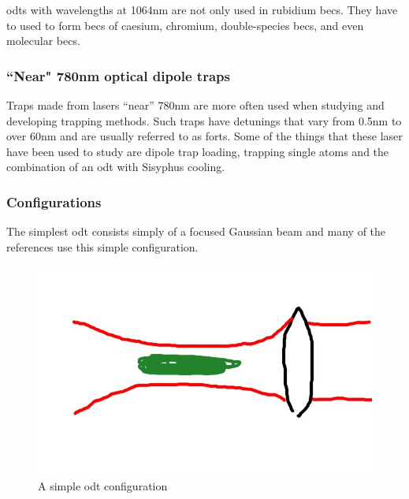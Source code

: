 \glspl{odt} with wavelengths at 1064nm are not only used in rubidium \glspl{bec}. They have to used to form \glspl{bec} of caesium\cite{hung_accelerating_2008}, chromium\cite{beaufils_all-optical_2008}, double-species \glspl{bec}\cite{thalhammer_double_2008}, and even molecular \glspl{bec}\cite{zwierlein_observation_2003}.

\subsubsection{``Near" 780nm optical dipole traps}
Traps made from lasers ``near'' 780nm are more often used when studying and developing trapping methods. Such traps have detunings that vary from 0.5nm\cite{miller_rf-induced_2002} to over 60nm\cite{miller_far-off-resonance_1993, weber_analysis_2006} and are usually referred to as \glspl{fort}. Some of the things that these laser have been used to study are dipole trap loading\cite{kuppens_loading_2000}, trapping single atoms\cite{weber_analysis_2006} and the combination of an \gls{odt} with Sisyphus cooling\cite{miller_rf-induced_2002}.

\subsubsection{Configurations}
The simplest \gls{odt} consists simply of a focused Gaussian beam\cite{chu_experimental_1986} and many of the references use this simple configuration.

\begin{figure}[h]
	\centering
	\includegraphics[scale=0.32]{figs/simpledipoletrap.jpg}
	\caption[Title]{A simple \gls{odt} configuration}
	\label{figs/MOT.pdf}
\end{figure}

